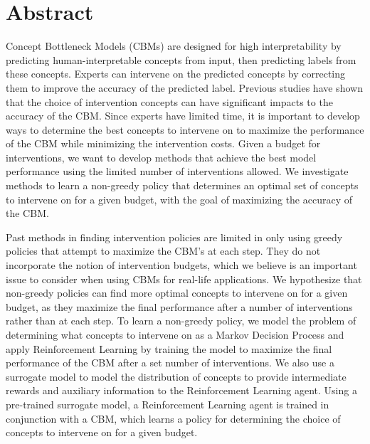 \documentclass[../main.tex]{subfiles}
\begin{document}
\chapter*{Abstract}




Concept Bottleneck Models (CBMs) are designed for high interpretability by predicting 
human-interpretable concepts from input, 
then predicting labels from these concepts. Experts can intervene on the 
predicted concepts
by correcting them to improve the accuracy of the predicted label. Previous 
studies have shown that the choice of intervention concepts 
can have significant impacts to the accuracy of the CBM.
Since experts have limited time, it is important to develop ways to
determine the best concepts to intervene on to maximize the performance 
of the CBM
while minimizing the intervention costs. Given a budget
for interventions, we want to develop methods that achieve the best model performance
using the limited number of interventions allowed.
We investigate methods to learn a non-greedy policy that determines an optimal set of 
concepts to intervene on
for a given budget, with the goal of maximizing the accuracy of the CBM.

Past methods in finding intervention policies are limited in
only using greedy policies 
that attempt to maximize the CBM's at each step.
They do not incorporate the notion of intervention budgets,
which we believe is an important issue to consider when using CBMs for real-life applications.
We hypothesize that non-greedy policies can find more optimal concepts to intervene on for a 
given budget,
as they maximize the final performance after a number of interventions rather than at each step.
To learn a non-greedy policy, we model the problem of determining what concepts to intervene on
as a Markov Decision Process
and apply Reinforcement Learning by training the model to maximize the final performance of the CBM
after a set number of interventions.
We also use a surrogate model to model the distribution of concepts to provide intermediate rewards and auxiliary information to the
Reinforcement Learning agent.
Using a pre-trained surrogate model, a Reinforcement Learning agent 
is trained in conjunction with a CBM, 
which learns a policy for determining the choice of concepts
to intervene on for a given budget.
\end{document}
